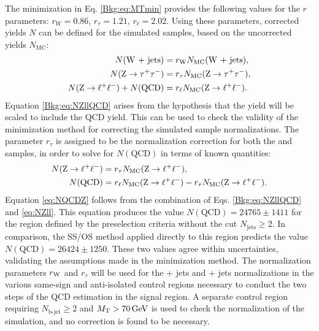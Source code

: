 The minimization in Eq. \eqref{Bkg:eq:MTmin} provides the following values for the $r$ parameters: $r_{W} = 0.86$, $r_{\tau} = 1.21$, $r_{\ell} = 2.02$. Using these parameters, corrected yields $N$ can be defined for the simulated samples, based on the uncorrected yields $N_{\text{MC}}$:
\begin{align}
N(\text{\W + jets}) &= r_{\W}N_{\text{MC}}(\text{\W + jets}), \\
N(\Ztt) &= r_{\tau}N_{\text{MC}}(\text{\Ztt}), \\
N(\Zll) + N(\text{QCD}) &= r_{\ell}N_{\text{MC}}(\text{\Zll}). \label{Bkg:eq:NZllQCD}
\end{align}
Equation \eqref{Bkg:eq:NZllQCD} arises from the hypothesis that the \Zll yield will be scaled to include the QCD yield. This can be used to check the validity of the \MT minimization method for correcting the simulated sample normalizations. The parameter $r_{\tau}$ is assigned to be the normalization correction for both the \Zll and \Ztt samples, in order to solve for $N(\text{QCD})$ in terms of known quantities:
\begin{align}
N({\mathrm{Z}} \rightarrow \ell^+\ell^-) &= r_{\tau}N_{\text{MC}}(\text{\ensuremath{{\mathrm{Z}} \rightarrow \ell^+\ell^-}}), \label{eq:NZll} \\
N(\text{QCD}) &= r_{\ell}N_{\text{MC}}(\text{\ensuremath{{\mathrm{Z}} \rightarrow \ell^+\ell^-}}) - r_{\tau}N_{\text{MC}}(\text{\ensuremath{{\mathrm{Z}} \rightarrow \ell^+\ell^-}}). \label{eq:NQCDZ}
\end{align}
Equation \eqref{eq:NQCDZ} follows from the combination of Eqs. \eqref{Bkg:eq:NZllQCD} and \eqref{eq:NZll}. This equation produces the value $N(\text{QCD}) = 24765 \pm 1411$ for the region defined by the preselection criteria without the cut $N_{\text{jets}}\geq2$. In comparison, the SS/OS method applied directly to this region predicts the value $N(\text{QCD}) = 26424 \pm 1250$. These two values agree within uncertainties, validating the assumptions made in the \MT minimization method. The normalization parameters $r_{\mathrm{W}}$ and $r_{\tau}$ will be used for the \W + jets and \Z + jets normalizations in the various same-sign and anti-isolated control regions necessary to conduct the two steps of the QCD estimation in the signal region. A separate control region requiring $N_{\text{b-jet}}\geq2$ and ${M}_{\text{T}}>70\,\text{Ge\hspace{-.08em}V}$ is used to check the normalization of the \ttbar simulation, and no correction is found to be necessary.

